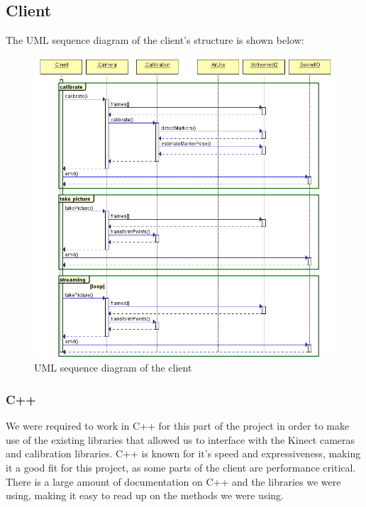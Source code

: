 \documentclass{article}
\begin{document}
\subsection{Client}
The UML sequence diagram of the client's structure is shown below:
\begin{figure}[h]
  \centering
  \includegraphics[scale=0.6]{clientUML}
  \caption{UML sequence diagram of the client}
\end{figure}
\subsubsection{C++}
We were required to work in C++ for this part of the project in order to make use of the existing libraries that allowed us to interface with the Kinect cameras and calibration libraries. C++ is known for it's speed and expressiveness, making it a good fit for this project, as some parts of the client are performance critical. There is a large amount of documentation on C++ and the libraries we were using, making it easy to read up on the methods we were using.
\end{document}
